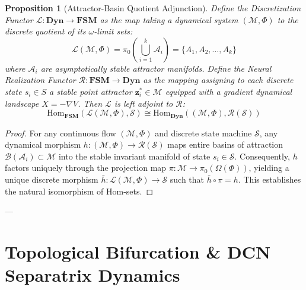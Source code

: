 \documentclass[11pt,a4paper]{article}
\newtheorem{proposition}[theorem]{Proposition}
\begin{document}
\begin{proposition}[Attractor-Basin Quotient Adjunction]
Define the Discretization Functor $\mathcal{L}: \mathbf{Dyn} \to \mathbf{FSM}$ as the map taking a dynamical system $(\mathcal{M}, \Phi)$ to the discrete quotient of its $\omega$-limit sets:
\begin{equation}
\mathcal{L}(\mathcal{M}, \Phi) = \pi_0\left( \bigcup_{i=1}^k \mathcal{A}_i \right) = \{A_1, A_2, \dots, A_k\}
\end{equation}
where $\mathcal{A}_i$ are asymptotically stable attractor manifolds. Define the Neural Realization Functor $\mathcal{R}: \mathbf{FSM} \to \mathbf{Dyn}$ as the mapping assigning to each discrete state $s_i \in S$ a stable point attractor $\mathbf{z}_i^* \in \mathcal{M}$ equipped with a gradient dynamical landscape $X = -\nabla V$. Then $\mathcal{L}$ is left adjoint to $\mathcal{R}$:
\begin{equation}
\text{Hom}_{\mathbf{FSM}}(\mathcal{L}(\mathcal{M}, \Phi), \mathcal{S}) \cong \text{Hom}_{\mathbf{Dyn}}((\mathcal{M}, \Phi), \mathcal{R}(\mathcal{S}))
\end{equation}
\end{proposition}

\begin{proof}
For any continuous flow $(\mathcal{M}, \Phi)$ and discrete state machine $\mathcal{S}$, any dynamical morphism $h: (\mathcal{M}, \Phi) \to \mathcal{R}(\mathcal{S})$ maps entire basins of attraction $\mathcal{B}(\mathcal{A}_i) \subset \mathcal{M}$ into the stable invariant manifold of state $s_i \in \mathcal{S}$. Consequently, $h$ factors uniquely through the projection map $\pi: \mathcal{M} \to \pi_0(\Omega(\Phi))$, yielding a unique discrete morphism $\bar{h}: \mathcal{L}(\mathcal{M}, \Phi) \to \mathcal{S}$ such that $\bar{h} \circ \pi = h$. This establishes the natural isomorphism of Hom-sets.
\end{proof}

---

\section{Topological Bifurcation \& DCN Separatrix Dynamics}
\end{document}
